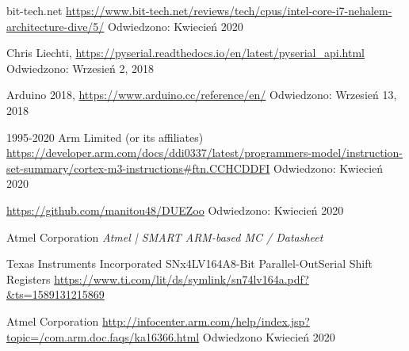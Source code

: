 \documentclass[a4paper,12pt]{article}
\begin{document}
\begin{thebibliography}{99}
        bit-tech.net
        \url{https://www.bit-tech.net/reviews/tech/cpus/intel-core-i7-nehalem-architecture-dive/5/}
        Odwiedzono:
        Kwiecień 2020

	Chris Liechti,	
	\url{https://pyserial.readthedocs.io/en/latest/pyserial_api.html}
        Odwiedzono: Wrzesień 2, 2018
        
	 Arduino 2018,
	 \url{https://www.arduino.cc/reference/en/}
        Odwiedzono: Wrzesień 13, 2018	 
        
        1995-2020 Arm Limited (or its affiliates)
        \url{https://developer.arm.com/docs/ddi0337/latest/programmers-model/instruction-set-summary/cortex-m3-instructions#ftn.CCHCDDFI}
        Odwiedzono: Kwiecień 2020

        \url{https://github.com/manitou48/DUEZoo}
        Odwiedzono: Kwiecień 2020

        Atmel Corporation
        \textit{Atmel | SMART ARM-based MC  / Datasheet}

        Texas Instruments Incorporated
        SNx4LV164A8-Bit Parallel-OutSerial Shift Registers
        \url{https://www.ti.com/lit/ds/symlink/sn74lv164a.pdf?&ts=1589131215869}

        Atmel Corporation
        \url{http://infocenter.arm.com/help/index.jsp?topic=/com.arm.doc.faqs/ka16366.html}
        Odwiedzono Kwiecień 2020

\end{thebibliography}
\end{document}
